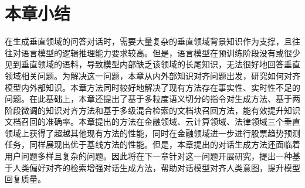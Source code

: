 \section{本章小结}

在生成垂直领域的问答对话时，需要大量复杂的垂直领域背景知识作为支撑，且往往对语言模型的逻辑推理能力要求较高。但是，语言模型在预训练阶段没有或很少见到垂直领域的语料，导致模型内部缺乏该领域的长尾知识，无法很好地回答垂直领域相关问题。为解决这一问题，本章从内外部知识对齐问题出发，研究如何对齐模型内外部知识。本章方法同时较好地解决了现有方法存在事实性、实时性不足的问题。在此基础上，本章还提出了基于多粒度语义切分的指令对生成方法、基于两阶段微调的知识对齐方法和基于多级混合检索的文档块召回方法，能有效提升知识文档召回的准确率。本章提出的方法在金融领域、云计算领域、法律领域三个垂直领域上获得了超越其他现有方法的性能，同时在金融领域进一步进行股票趋势预测任务，同样展现出优于基线方法的性能。但是，本章提出的对话生成方法还面临着用户问题多样且复杂的问题。因此将在下一章针对这一问题开展研究，提出一种基于人类偏好对齐的检索增强对话生成方法，帮助对话模型对齐人类意图，提升模型回复质量。